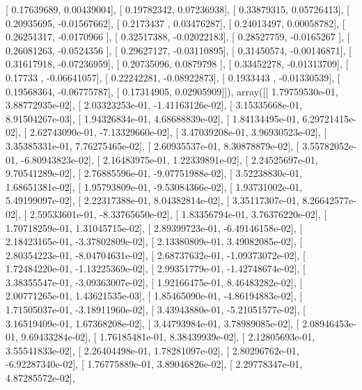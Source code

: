 \documentclass{article}
\begin{document}
       [ 0.17639689,  0.00439004],
       [ 0.19782342,  0.07236938],
       [ 0.33879315,  0.05726413],
       [ 0.20935695, -0.01567662],
       [ 0.2173437 ,  0.03476287],
       [ 0.24013497,  0.00058782],
       [ 0.26251317, -0.0170966 ],
       [ 0.32517388, -0.02022183],
       [ 0.28527759, -0.0165267 ],
       [ 0.26081263, -0.0524356 ],
       [ 0.29627127, -0.03110895],
       [ 0.31450574, -0.00146871],
       [ 0.31617918, -0.07236959],
       [ 0.20735096,  0.0879798 ],
       [ 0.33452278, -0.01313709],
       [ 0.17733   , -0.06641057],
       [ 0.22242281, -0.08922873],
       [ 0.1933443 , -0.01330539],
       [ 0.19568364, -0.06775787],
       [ 0.17314905,  0.02905909]]), array([[  1.79759530e-01,   3.88772935e-02],
       [  2.03323253e-01,  -1.41163126e-02],
       [  3.15335668e-01,   8.91504267e-03],
       [  1.94326834e-01,   4.68688839e-02],
       [  1.84134495e-01,   6.29721415e-02],
       [  2.62743090e-01,  -7.13329660e-02],
       [  3.47039208e-01,   3.96930523e-02],
       [  3.35385331e-01,   7.76275465e-02],
       [  2.60935537e-01,   8.30878879e-02],
       [  3.55782052e-01,  -6.80943823e-02],
       [  2.16483975e-01,   1.22339891e-02],
       [  2.24525697e-01,   9.70541289e-02],
       [  2.76885596e-01,  -9.07751988e-02],
       [  3.52238830e-01,   1.68651381e-02],
       [  1.95793809e-01,  -9.53084366e-02],
       [  1.93731002e-01,   5.49199097e-02],
       [  2.22317388e-01,   8.04382814e-02],
       [  3.35117307e-01,   8.26642577e-02],
       [  2.59533601e-01,  -8.33765650e-02],
       [  1.83356794e-01,   3.76376220e-02],
       [  1.70718259e-01,   1.31045715e-02],
       [  2.89399723e-01,  -6.49146158e-02],
       [  2.18423165e-01,  -3.37802809e-02],
       [  2.13380809e-01,   3.49082085e-02],
       [  2.80354223e-01,  -8.04704631e-02],
       [  2.68737632e-01,  -1.09373072e-02],
       [  1.72484220e-01,  -1.13225369e-02],
       [  2.99351779e-01,  -1.42748674e-02],
       [  3.38355547e-01,  -3.09363007e-02],
       [  1.92166475e-01,   8.46483282e-02],
       [  2.00771265e-01,   1.43621535e-03],
       [  1.85465090e-01,  -4.86194883e-02],
       [  1.71505037e-01,  -3.18911960e-02],
       [  3.43943880e-01,  -5.21051577e-02],
       [  3.16519409e-01,   1.67368208e-02],
       [  3.44793984e-01,   3.78989085e-02],
       [  2.08946453e-01,   9.69433284e-02],
       [  1.76185481e-01,   8.38439939e-02],
       [  2.12805693e-01,   3.55541833e-02],
       [  2.26404498e-01,   1.78281097e-02],
       [  2.80296762e-01,  -6.92287340e-02],
       [  1.76775889e-01,   3.89046826e-02],
       [  2.29778347e-01,   4.87285572e-02],
\end{document}

